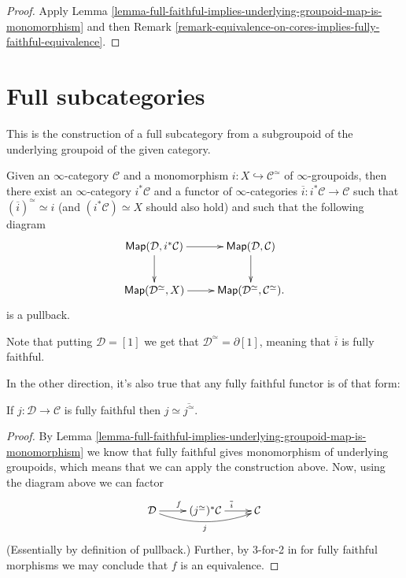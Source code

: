 \begin{proof}
Apply Lemma 
\ref{lemma-full-faithful-implies-underlying-groupoid-map-is-monomorphism}
and then Remark
\ref{remark-equivalence-on-cores-implies-fully-faithful-equivalence}.
\end{proof}

\section{Full subcategories}
\label{section-full-subcactegories}

\noindent
This is the construction of a full subcategory
from a subgroupoid of the underlying groupoid of the given category.

Given an $\infty$-category $\mathcal{C}$
and a monomorphism $i:X \hookrightarrow  \mathcal{C}^\simeq$ of $\infty$-groupoids,
then there exist an $\infty$-category $i^*\mathcal{C}$
and a functor of $\infty$-categories
$\overline{i}:i^*\mathcal{C} \to \mathcal{C}$ 
such that $(\overline{i})^\simeq \simeq i$
(and $(i^*\mathcal{C})\simeq X$ should also hold)
and such that the following diagram
$$
\xymatrix{
\mathsf{Map}(\mathcal{D},i^*\mathcal{C})\ar[r]\ar[d]&
\mathsf{Map}(\mathcal{D},\mathcal{C})\ar[d]\\
\mathsf{Map}(\mathcal{D}^\simeq,X)\ar[r]&
\mathsf{Map}(\mathcal{D}^\simeq,\mathcal{C}^\simeq).
}
$$
is a pullback.

Note that putting $\mathcal{D}=[1]$ 
we get that $\mathcal{D}^\simeq=\partial[1]$,
meaning that $\overline{i}$ is fully faithful.

In the other direction, it's also true that any fully faithful
functor is of that form:

\begin{lemma}
\label{lemma-fully-faithful-subcategories}
If $j:\mathcal{D} \to \mathcal{C}$ is fully faithful
then $j \simeq \overline{j^\simeq}$.
\end{lemma}

\begin{proof}
By Lemma
\ref{lemma-full-faithful-implies-underlying-groupoid-map-is-monomorphism}
we know that fully faithful gives monomorphism of underlying groupoids,
which means that we can apply the construction above.
Now, using the diagram above we can factor
$$
\xymatrix{
\mathcal{D}\ar[r]^f\ar@/_1em/[rr]_j
&(j^\simeq)^*\mathcal{C} \ar[r]^{\overline{i}}
&\mathcal{C}
}
$$
(Essentially by definition of pullback.)
Further, by 3-for-2 in for fully faithful morphisms we may
conclude that $f$ is an equivalence.
\end{proof}

